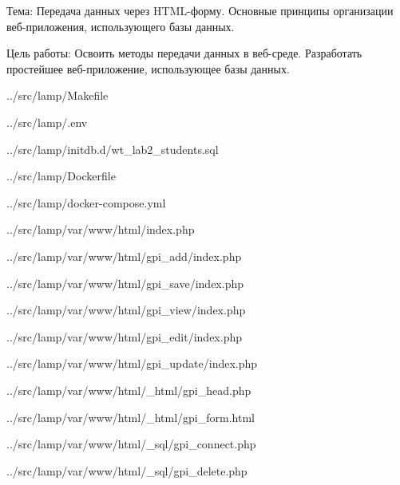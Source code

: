 Тема:
Передача данных через HTML-форму.
Основные принципы организации веб-приложения, использующего базы данных.

Цель работы:
Освоить методы передачи данных в веб-среде.
Разработать простейшее веб-приложение, использующее базы данных.


{../src/lamp/Makefile}


{../src/lamp/.env}


{../src/lamp/initdb.d/wt_lab2_students.sql}


{../src/lamp/Dockerfile}

\newpage


{../src/lamp/docker-compose.yml}


{../src/lamp/var/www/html/index.php}

\newpage


{../src/lamp/var/www/html/gpi_add/index.php}


{../src/lamp/var/www/html/gpi_save/index.php}

\newpage


{../src/lamp/var/www/html/gpi_view/index.php}

\newpage


{../src/lamp/var/www/html/gpi_edit/index.php}


{../src/lamp/var/www/html/gpi_update/index.php}


{../src/lamp/var/www/html/_html/gpi_head.php}


{../src/lamp/var/www/html/_html/gpi_form.html}


{../src/lamp/var/www/html/_sql/gpi_connect.php}


{../src/lamp/var/www/html/_sql/gpi_delete.php}
